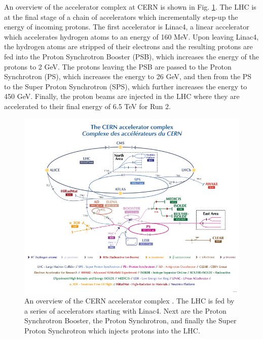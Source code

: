 An overview of the accelerator complex at CERN is shown in Fig. \ref{fig: accelerator-complex}. The \ac{LHC} is at the final stage of a chain of accelerators which incrementally step-up the energy of incoming protons. The first accelerator is Linac4, a linear accelerator which accelerates hydrogen atoms to an energy of 160 MeV. Upon leaving Linac4, the hydrogen atoms are stripped of their electrons and the resulting protons are fed into the Proton Synchrotron Booster (PSB), which increases the energy of the protons to 2 GeV. The protons leaving the PSB are passed to the Proton Synchrotron (PS), which increases the energy to 26 GeV, and then from the PS to the Super Proton Synchrotron (SPS), which further increases the energy to 450 GeV. Finally, the proton beams are injected in the \ac{LHC} where they are accelerated to their final energy of 6.5 TeV for Run 2.

\begin{figure}[htb!]
\includegraphics[width=\textwidth]{images/2-LHC-ATLAS/accelerator_complex.pdf}
\caption{An overview of the CERN accelerator complex \cite{CERN:2012:accelerators}. The \ac{LHC} is fed by a series of accelerators starting with Linac4. Next are the Proton Synchrotron Booster, the Proton Synchrotron, and finally the Super Proton Synchrotron which injects protons into the \ac{LHC}.}
\label{fig: accelerator-complex}
\end{figure}



